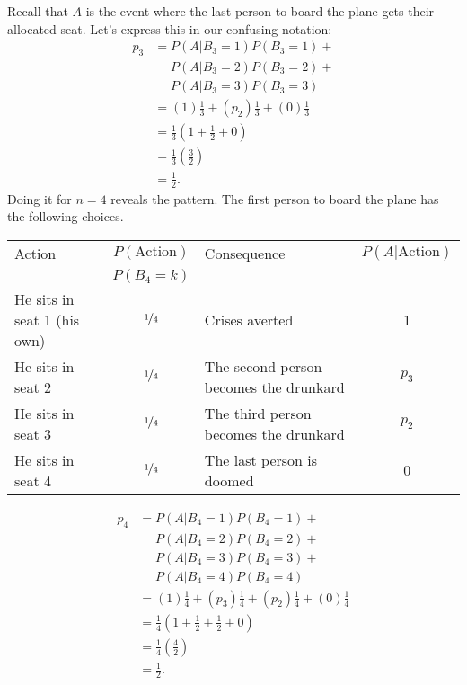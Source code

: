\documentclass[a4paper]{article}
\begin{document}
Recall that $A$ is the event where the last person to board the plane gets their allocated seat. Let's express this in our confusing notation:
\begin{align*}
  p_3
  &=
                         P(A|B_3 = 1)P(B_3=1) + {}\\
      &\phantom{{} = {}} P(A|B_3 = 2)P(B_3=2) + {}\\
      &\phantom{{} = {}} P(A|B_3 = 3)P(B_3=3)
  \\
  &=
  (1)   \frac{1}{3}  +
  (p_2) \frac{1}{3} +
  (0)   \frac{1}{3} \\
& =\frac{1}{3}\left(1 +  \frac{1}{2} + 0\right) \\
& =\frac{1}{3}\left(\frac{3}{2}\right)  \\
& =\frac{1}{2}
\text{.}
\end{align*}
Doing it for $n=4$ reveals the pattern.
The first person to board the plane has the following choices.
\begin{center}
\begin{tabular}{lclc}
\hline
 Action                    & $P(\text{Action})$ &  Consequence                             & $P(A|\text{Action})$ \\
                           & $P(B_4 = k)$       &                                          &               \\
 \hline
He sits in seat 1 (his own)& $\nicefrac{1}{4}$  &  Crises averted                          & 1\\
He sits in seat 2          & $\nicefrac{1}{4}$  &  The second person becomes the drunkard  & $p_3$\\
He sits in seat 3          & $\nicefrac{1}{4}$  &  The third person becomes the drunkard   & $p_2$\\
He sits in seat 4          & $\nicefrac{1}{4}$  &  The last person is doomed               & 0\\
\hline
\end{tabular}
\end{center}
\begin{align*}
  p_4
      &=                 P(A|B_4 = 1)P(B_4=1)  + {}\\
      &\phantom{{} = {}} P(A|B_4 = 2)P(B_4=2) + {}\\
      &\phantom{{} = {}} P(A|B_4 = 3)P(B_4=3) + {}\\
      &\phantom{{} = {}} P(A|B_4 = 4)P(B_4=4)
  \\
 & =
  (1)   \frac{1}{4} +
  (p_3) \frac{1}{4} +
  (p_2) \frac{1}{4} +
  (0)   \frac{1}{4} \\
& =\frac{1}{4}\left(1 +  \frac{1}{2} + \frac{1}{2} + 0\right) \\
& =\frac{1}{4}\left(\frac{4}{2}\right)  \\
& =\frac{1}{2}
\text{.}
\end{align*}
\end{document}
